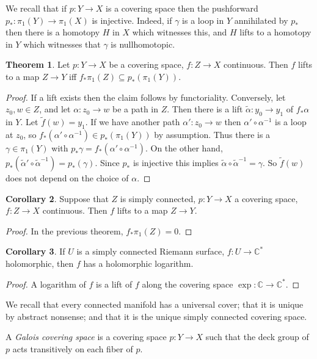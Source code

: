 \documentclass[12pt]{book}
\newcommand{\CC}{\mathbb{C}}
\newcommand{\dfn}[1]{\emph{#1}\index{#1}}
\theoremstyle{definition}
\newtheorem{theorem}{Theorem}[chapter]
\newtheorem{corollary}[theorem]{Corollary}
\newenvironment{definition}
  {\pushQED{\qed}\renewcommand{\qedsymbol}{$\diamondsuit$}\definitionx}
  {\popQED\endexamplex}
\begin{document}
We recall that if $p: Y \to X$ is a covering space then the pushforward $p_*: \pi_1(Y) \to \pi_1(X)$ is injective.
Indeed, if $\gamma$ is a loop in $Y$ annihilated by $p_*$ then there is a homotopy $H$ in $X$ which witnesses this, and $H$ lifts to a homotopy in $Y$ which witnesses that $\gamma$ is nullhomotopic.

\begin{theorem}
Let $p: Y \to X$ be a covering space, $f: Z \to X$ continuous. Then $f$ lifts to a map $Z \to Y$ iff $f_* \pi_1(Z) \subseteq p_*(\pi_1(Y))$.
\end{theorem}
\begin{proof}
If a lift exists then the claim follows by functoriality.
Conversely, let $z_0, w \in Z$, and let $\alpha: z_0 \to w$ be a path in $Z$.
Then there is a lift $\tilde \alpha: y_0 \to y_1$ of $f_*\alpha$ in $Y$.
Let $\tilde f(w) = y_1$.
If we have another path $\alpha': z_0 \to w$ then $\alpha' \circ \alpha^{-1}$ is a loop at $z_0$, so $f_*(\alpha' \circ \alpha^{-1}) \in p_*(\pi_1(Y))$ by assumption.
Thus there is a $\gamma \in \pi_1(Y)$ with $p_*\gamma = f_*(\alpha' \circ \alpha^{-1})$.
On the other hand, $p_*(\tilde \alpha' \circ \tilde \alpha^{-1}) = p_*(\gamma)$.
Since $p_*$ is injective this implies $\tilde \alpha \circ \tilde \alpha^{-1} = \gamma$.
So $\tilde f(w)$ does not depend on the choice of $\alpha$.
\end{proof}

\begin{corollary}
Suppose that $Z$ is simply connected, $p: Y \to X$ a covering space, $f: Z \to X$ continuous. Then $f$ lifts to a map $Z \to Y$.
\end{corollary}
\begin{proof}
In the previous theorem, $f_* \pi_1(Z) = 0$.
\end{proof}

\begin{corollary}
If $U$ is a simply connected Riemann surface, $f: U \to \CC^*$ holomorphic, then $f$ has a holomorphic logarithm.
\end{corollary}
\begin{proof}
A logarithm of $f$ is a lift of $f$ along the covering space $\exp: \CC \to \CC^*$.
\end{proof}

We recall that every connected manifold has a universal cover; that it is unique by abstract nonsense; and that it is the unique simply connected covering space.

\begin{definition}
A \dfn{Galois covering space} is a covering space $p: Y \to X$ such that the deck group of $p$ acts transitively on each fiber of $p$.
\end{definition}
\end{document}
